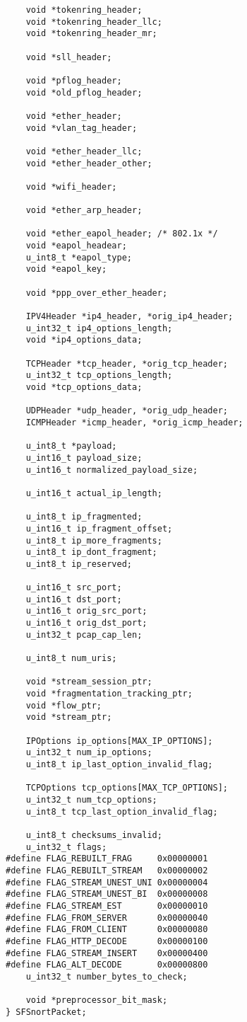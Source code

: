 \documentclass[english]{report}
\begin{document}
\begin{verbatim}
    void *tokenring_header;
    void *tokenring_header_llc;
    void *tokenring_header_mr;

    void *sll_header;

    void *pflog_header;
    void *old_pflog_header;

    void *ether_header;
    void *vlan_tag_header;

    void *ether_header_llc;
    void *ether_header_other;

    void *wifi_header;

    void *ether_arp_header;

    void *ether_eapol_header; /* 802.1x */
    void *eapol_headear;
    u_int8_t *eapol_type;
    void *eapol_key;

    void *ppp_over_ether_header;

    IPV4Header *ip4_header, *orig_ip4_header;
    u_int32_t ip4_options_length;
    void *ip4_options_data;

    TCPHeader *tcp_header, *orig_tcp_header;
    u_int32_t tcp_options_length;
    void *tcp_options_data;

    UDPHeader *udp_header, *orig_udp_header;
    ICMPHeader *icmp_header, *orig_icmp_header;

    u_int8_t *payload;
    u_int16_t payload_size;
    u_int16_t normalized_payload_size;

    u_int16_t actual_ip_length;

    u_int8_t ip_fragmented;
    u_int16_t ip_fragment_offset;
    u_int8_t ip_more_fragments;
    u_int8_t ip_dont_fragment;
    u_int8_t ip_reserved;

    u_int16_t src_port;
    u_int16_t dst_port;
    u_int16_t orig_src_port;
    u_int16_t orig_dst_port;
    u_int32_t pcap_cap_len;

    u_int8_t num_uris;

    void *stream_session_ptr;
    void *fragmentation_tracking_ptr;
    void *flow_ptr;
    void *stream_ptr;

    IPOptions ip_options[MAX_IP_OPTIONS];
    u_int32_t num_ip_options;
    u_int8_t ip_last_option_invalid_flag;

    TCPOptions tcp_options[MAX_TCP_OPTIONS];
    u_int32_t num_tcp_options;
    u_int8_t tcp_last_option_invalid_flag;

    u_int8_t checksums_invalid;
    u_int32_t flags;
#define FLAG_REBUILT_FRAG     0x00000001
#define FLAG_REBUILT_STREAM   0x00000002
#define FLAG_STREAM_UNEST_UNI 0x00000004
#define FLAG_STREAM_UNEST_BI  0x00000008
#define FLAG_STREAM_EST       0x00000010
#define FLAG_FROM_SERVER      0x00000040
#define FLAG_FROM_CLIENT      0x00000080
#define FLAG_HTTP_DECODE      0x00000100
#define FLAG_STREAM_INSERT    0x00000400
#define FLAG_ALT_DECODE       0x00000800
    u_int32_t number_bytes_to_check;

    void *preprocessor_bit_mask;
} SFSnortPacket;

\end{verbatim}
\end{document}
